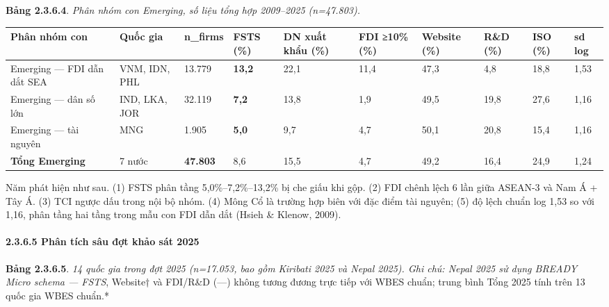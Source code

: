 \documentclass[12pt,a4paper]{article}
\begin{document}
\textbf{Bảng 2.3.6.4}. \emph{Phân nhóm con Emerging, số liệu tổng hợp
2009--2025 (n=47.803).}

\begin{longtable}[]{@{}llllllllll@{}}
\toprule\noalign{}
Phân nhóm con & Quốc gia & n\_firms & FSTS (\%) & DN xuất khẩu (\%) &
FDI ≥10\% (\%) & Website (\%) & R\&D (\%) & ISO (\%) & sd log \\
\midrule\noalign{}
\endhead
\bottomrule\noalign{}
\endlastfoot
Emerging --- FDI dẫn dắt SEA & VNM, IDN, PHL & 13.779 & \textbf{13,2} &
22,1 & 11,4 & 47,3 & 4,8 & 18,8 & 1,53 \\
Emerging --- dân số lớn & IND, LKA, JOR & 32.119 & \textbf{7,2} & 13,8 &
1,9 & 49,5 & 19,8 & 27,6 & 1,16 \\
Emerging --- tài nguyên & MNG & 1.905 & \textbf{5,0} & 9,7 & 4,7 & 50,1
& 20,8 & 15,4 & 1,16 \\
\textbf{Tổng Emerging} & 7 nước & \textbf{47.803} & 8,6 & 15,5 & 4,7 &
49,2 & 16,4 & 24,9 & 1,24 \\
\end{longtable}

Năm phát hiện như sau. (1) FSTS phân tầng 5,0\%--7,2\%--13,2\% bị che
giấu khi gộp. (2) FDI chênh lệch 6 lần giữa ASEAN-3 và Nam Á + Tây Á.
(3) TCI ngược dấu trong nội bộ nhóm. (4) Mông Cổ là trường hợp biên với
đặc điểm tài nguyên; (5) độ lệch chuẩn log 1,53 so với 1,16, phân tầng
hai tầng trong mẫu con FDI dẫn dắt (Hsieh \& Klenow, 2009).

\hypertarget{2365-phuxe2n-tuxedch-suxe2u-ux111ux1ee3t-khux1ea3o-suxe1t-2025}{%
\paragraph{2.3.6.5 Phân tích sâu đợt khảo sát
2025}\label{2365-phuxe2n-tuxedch-suxe2u-ux111ux1ee3t-khux1ea3o-suxe1t-2025}}

\textbf{Bảng 2.3.6.5}. \emph{14 quốc gia trong đợt 2025 (n=17.053, bao
gồm Kiribati 2025 và Nepal 2025). Ghi chú: Nepal 2025 sử dụng BREADY
Micro schema --- FSTS}, Website† và FDI/R\&D (---) không tương đương
trực tiếp với WBES chuẩn; trung bình Tổng 2025 tính trên 13 quốc gia
WBES chuẩn.*
\end{document}
